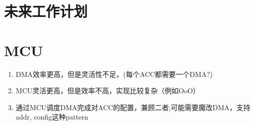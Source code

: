 \documentclass[a4paper, 12pt]{article}
\begin{document}
\newpage
\section{未来工作计划}%


\newpage
\section{MCU}%
  \label{sec:MCU}
  \begin{enumerate}
    \item DMA效率更高，但是灵活性不足，(每个ACC都需要一个DMA?)
    \item MCU灵活更高，但是效率不高，实现比较复杂（例如OoO）
    \item 通过MCU调度DMA完成对ACC的配置，兼顾二者;可能需要魔改DMA，支持addr, config这种pattern
  \end{enumerate}



\end{document}
